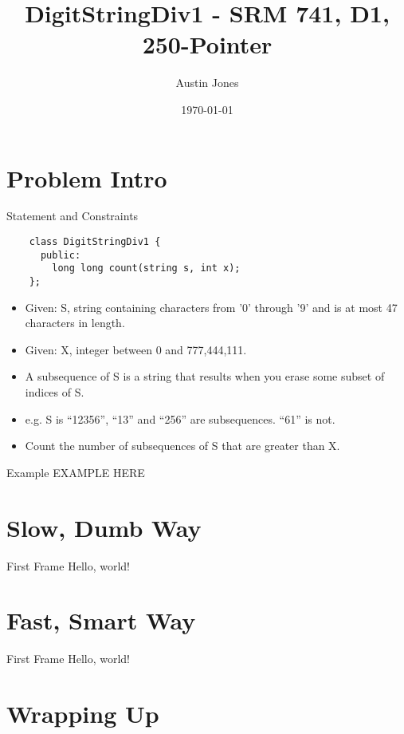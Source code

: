 \documentclass[10pt]{beamer}
\author{Austin Jones}
\title{DigitStringDiv1 \-- SRM 741, D1, 250-Pointer}
\date{\today}
\institute{University of Tennessee \-- Knoxville}
\begin{document}
\maketitle

\section{Problem Intro}

\begin{frame}[fragile]{Statement and Constraints}
  \begin{verbatim}
    class DigitStringDiv1 {
      public:
        long long count(string s, int x);
    };
  \end{verbatim}
  \begin{itemize}
    \item Given: S, string containing characters from '0' through '9' and is at most 47 characters in length.
    \item Given: X, integer between 0 and 777,444,111.
    \item A subsequence of S is a string that results when you erase some subset of indices of S.
    \item e.g. S is ``12356'', ``13'' and ``256'' are subsequences. ``61'' is not.
    \item Count the number of subsequences of S that are greater than X.
  \end{itemize}
\end{frame}

\begin{frame}{Example}
  EXAMPLE HERE
\end{frame}

\section{Slow, Dumb Way}

\begin{frame}{First Frame}
  Hello, world!
\end{frame}

\section{Fast, Smart Way}

\begin{frame}{First Frame}
  Hello, world!
\end{frame}


\section{Wrapping Up}
\end{document}
